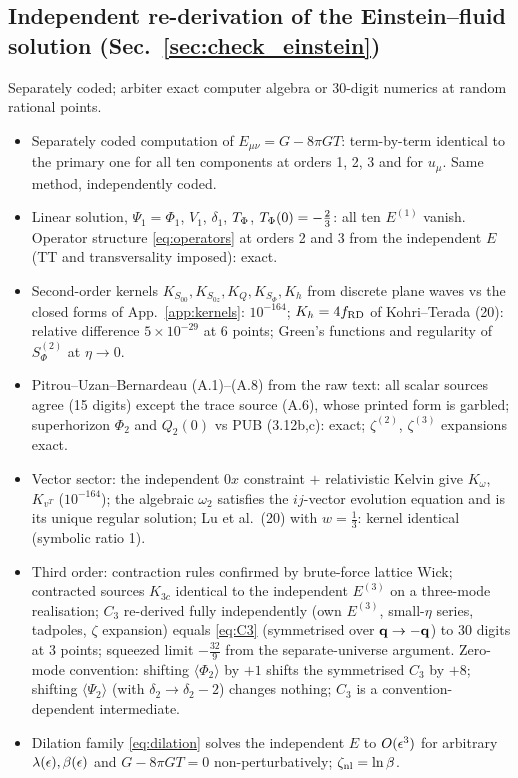 \subsection*{Independent re-derivation of the Einstein--fluid solution (Sec.~\ref{sec:check_einstein})}
Separately coded; arbiter exact computer algebra or 30-digit numerics at random rational points.
\begin{itemize}\itemsep1pt
\item[EF-15] Separately coded computation of $E_{\mu\nu}=G-8\pi GT$: term-by-term identical to the primary one for all ten components at orders 1, 2, 3 and for $u_\mu$.  Same method, independently coded.
\item[EF-16] Linear solution, $\Psi_1=\Phi_1$, $V_1$, $\delta_1$, $T_\Phi$, $T_\Phi(0)=-\tfrac23$: all ten $E^{(1)}$ vanish.  Operator structure \eqref{eq:operators} at orders 2 and 3 from the independent $E$ (TT and transversality imposed): exact.
\item[EF-17] Second-order kernels $K_{S_{00}},K_{S_{0z}},K_Q,K_{S_\Phi},K_h$ from discrete plane waves vs the closed forms of App.~\ref{app:kernels}: $10^{-164}$; $K_h=4f_{\rm RD}$ of Kohri--Terada (20): relative difference $5\times10^{-29}$ at 6 points; Green's functions and regularity of $S^{(2)}_\Phi$ at $\eta\to0$.
\item[EF-18] Pitrou--Uzan--Bernardeau (A.1)--(A.8) from the raw text: all scalar sources agree (15 digits) except the trace source (A.6), whose printed form is garbled; superhorizon $\Phi_2$ and $Q_2(0)$ vs PUB (3.12b,c): exact; $\zeta^{(2)}$, $\zeta^{(3)}$ expansions exact.
\item[EF-19] Vector sector: the independent $0x$ constraint $+$ relativistic Kelvin give $K_\omega$, $K_{v^T}$ ($10^{-164}$); the algebraic $\omega_2$ satisfies the $ij$-vector evolution equation and is its unique regular solution; Lu et al.\ (20) with $w=\tfrac13$: kernel identical (symbolic ratio 1).
\item[EF-20] Third order: contraction rules confirmed by brute-force lattice Wick; contracted sources $K_{3c}$ identical to the independent $E^{(3)}$ on a three-mode realisation; $C_3$ re-derived fully independently (own $E^{(3)}$, small-$\eta$ series, tadpoles, $\zeta$ expansion) equals \eqref{eq:C3} (symmetrised over $\mathbf q\to-\mathbf q$) to 30 digits at 3 points; squeezed limit $-\tfrac{32}9$ from the separate-universe argument.  Zero-mode convention: shifting $\langle\Phi_2\rangle$ by $+1$ shifts the symmetrised $C_3$ by $+8$; shifting $\langle\Psi_2\rangle$ (with $\delta_2\to\delta_2-2$) changes nothing; $C_3$ is a convention-dependent intermediate.
\item[EF-21] Dilation family \eqref{eq:dilation} solves the independent $E$ to $O(\epsilon^3)$ for arbitrary $\lambda(\epsilon),\beta(\epsilon)$ and $G-8\pi GT=0$ non-perturbatively; $\zeta_{\rm nl}=\ln\beta$.
\end{itemize}

